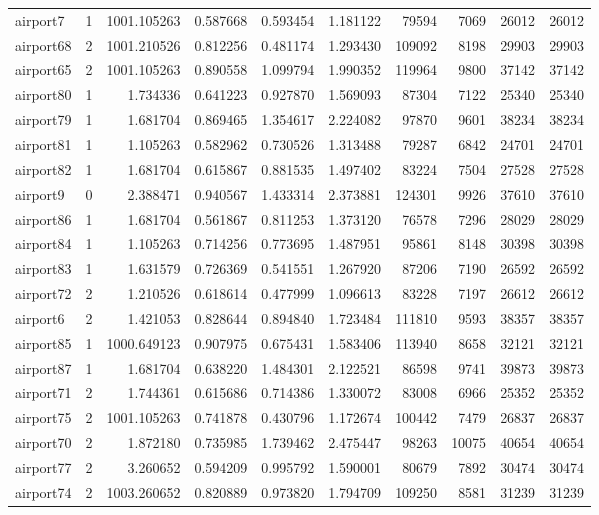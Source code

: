\begin{longtable}{|l|r|r|r|r|r|r|r|r|r|}
airport7 & 1 & 1001.105263 & 0.587668 & 0.593454 & 1.181122 & 79594 & 7069 & 26012 & 26012 \\
airport68 & 2 & 1001.210526 & 0.812256 & 0.481174 & 1.293430 & 109092 & 8198 & 29903 & 29903 \\
airport65 & 2 & 1001.105263 & 0.890558 & 1.099794 & 1.990352 & 119964 & 9800 & 37142 & 37142 \\
airport80 & 1 & 1.734336 & 0.641223 & 0.927870 & 1.569093 & 87304 & 7122 & 25340 & 25340 \\
airport79 & 1 & 1.681704 & 0.869465 & 1.354617 & 2.224082 & 97870 & 9601 & 38234 & 38234 \\
airport81 & 1 & 1.105263 & 0.582962 & 0.730526 & 1.313488 & 79287 & 6842 & 24701 & 24701 \\
airport82 & 1 & 1.681704 & 0.615867 & 0.881535 & 1.497402 & 83224 & 7504 & 27528 & 27528 \\
airport9 & 0 & 2.388471 & 0.940567 & 1.433314 & 2.373881 & 124301 & 9926 & 37610 & 37610 \\
airport86 & 1 & 1.681704 & 0.561867 & 0.811253 & 1.373120 & 76578 & 7296 & 28029 & 28029 \\
airport84 & 1 & 1.105263 & 0.714256 & 0.773695 & 1.487951 & 95861 & 8148 & 30398 & 30398 \\
airport83 & 1 & 1.631579 & 0.726369 & 0.541551 & 1.267920 & 87206 & 7190 & 26592 & 26592 \\
airport72 & 2 & 1.210526 & 0.618614 & 0.477999 & 1.096613 & 83228 & 7197 & 26612 & 26612 \\
airport6 & 2 & 1.421053 & 0.828644 & 0.894840 & 1.723484 & 111810 & 9593 & 38357 & 38357 \\
airport85 & 1 & 1000.649123 & 0.907975 & 0.675431 & 1.583406 & 113940 & 8658 & 32121 & 32121 \\
airport87 & 1 & 1.681704 & 0.638220 & 1.484301 & 2.122521 & 86598 & 9741 & 39873 & 39873 \\
airport71 & 2 & 1.744361 & 0.615686 & 0.714386 & 1.330072 & 83008 & 6966 & 25352 & 25352 \\
airport75 & 2 & 1001.105263 & 0.741878 & 0.430796 & 1.172674 & 100442 & 7479 & 26837 & 26837 \\
airport70 & 2 & 1.872180 & 0.735985 & 1.739462 & 2.475447 & 98263 & 10075 & 40654 & 40654 \\
airport77 & 2 & 3.260652 & 0.594209 & 0.995792 & 1.590001 & 80679 & 7892 & 30474 & 30474 \\
airport74 & 2 & 1003.260652 & 0.820889 & 0.973820 & 1.794709 & 109250 & 8581 & 31239 & 31239 \\

\end{longtable}
